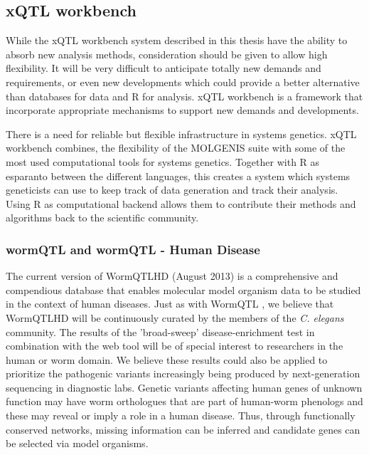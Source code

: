 \subsection*{xQTL workbench}
While the xQTL workbench system described in this thesis have the ability to absorb new 
analysis methods, consideration should be given to allow high flexibility. It will be very 
difficult to anticipate totally new demands and requirements, or even new developments 
which could provide a better alternative than databases for data and R for analysis. xQTL 
workbench is a framework that incorporate appropriate mechanisms to support new demands and 
developments.

There is a need for reliable but flexible infrastructure in systems genetics. xQTL workbench 
combines, the flexibility of the MOLGENIS suite with some of the most used computational tools 
for systems genetics. Together with R as esparanto between the different languages, this creates 
a system which systems geneticists can use to keep track of data generation and track their analysis. 
Using R as computational backend allows them to contribute their methods and algorithms back to 
the scientific community.

\subsubsection*{wormQTL and wormQTL - Human Disease}
The current version of WormQTLHD (August 2013) is a comprehensive and compendious database that 
enables molecular model organism data to be studied in the context of human diseases. Just as with 
WormQTL \cite{Snoek:2012}, we believe that WormQTLHD will be continuously curated by the members of 
the \emph{C. elegans} community. The results of the 'broad-sweep' disease-enrichment test in 
combination with the web tool will be of special interest to researchers in the human or worm 
domain. We believe these results could also be applied to prioritize the pathogenic variants 
increasingly being produced by next-generation sequencing in diagnostic labs. Genetic variants 
affecting human genes of unknown function may have worm orthologues that are part of human-worm 
phenologs and these may reveal or imply a role in a human disease. Thus, through functionally 
conserved networks, missing information can be inferred and candidate genes can be selected via 
model organisms.

